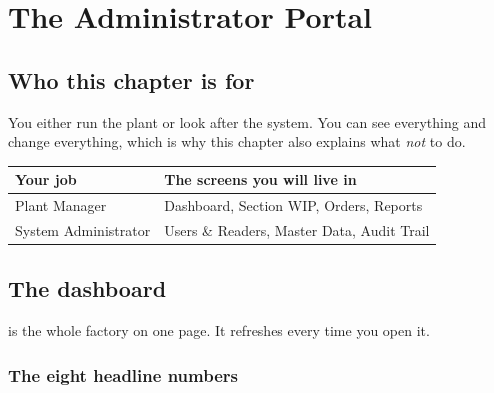 \chapter{The Administrator Portal}
\label{ch:admin}


\section{Who this chapter is for}

You either run the plant or look after the system. You can see everything and
change everything, which is why this chapter also explains what \emph{not} to do.

\begin{table}[H]
\centering
\small
\begin{tabular}{@{}p{40mm}p{98mm}@{}}
\toprule
\textbf{Your job} & \textbf{The screens you will live in} \\
\midrule
Plant Manager &
  Dashboard, Section WIP, Orders, Reports \\
System Administrator &
  Users \& Readers, Master Data, Audit Trail \\
\bottomrule
\end{tabular}
\end{table}

\section{The dashboard}

 is the whole factory on one page. It refreshes every time you
open it.


\subsection{The eight headline numbers}

